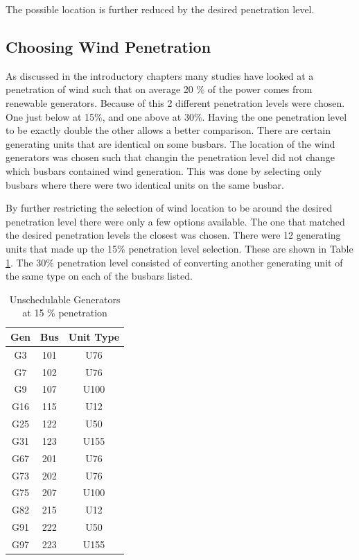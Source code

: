 \documentclass[a4paper,oneside,12pt]{report}
\begin{document}
The possible location is further reduced by the desired penetration level.

\subsection{Choosing Wind Penetration}

As discussed in the introductory chapters many studies have looked at a penetration of wind such that on average 20 \% of the power comes from renewable generators. Because of this 2 different penetration levels were chosen. One just below at 15\%, and one above at 30\%. Having the one penetration level to be exactly double the other allows a better comparison. There are certain generating units that are identical on some busbars. The location of the wind generators was chosen such that changin the penetration level did not change which busbars contained wind generation. This was done by selecting only busbars where there were two identical units on the same busbar. 

By further restricting the selection of wind location to be around the desired penetration level there were only a few options available. The one that matched the desired penetration levels the closest was chosen. There were 12 generating units that made up the 15\% penetration level selection. These are shown in Table \ref{table_unsch_generators}. The 30\% penetration level consisted of converting another generating unit of the same type on each of the busbars listed.

\begin{table}[htbp]
\caption{Unschedulable Generators at 15 \% penetration}
\label{table_unsch_generators}
\centering
\begin{tabular}{c||c||c}
\bfseries Gen & \bfseries Bus & \bfseries Unit Type \\
\hline \hline
G3  & 101& U76 \\
G7  & 102 & U76 \\
G9  & 107 & U100 \\
G16 & 115 & U12 \\
G25 & 122 & U50 \\
G31 & 123 & U155 \\
\hline
G67 & 201& U76 \\
G73 & 202 & U76 \\
G75 & 207 & U100 \\
G82 & 215 & U12 \\
G91 & 222 & U50 \\
G97 & 223 & U155 \\
\hline
\end{tabular}
\end{table}
\end{document}
